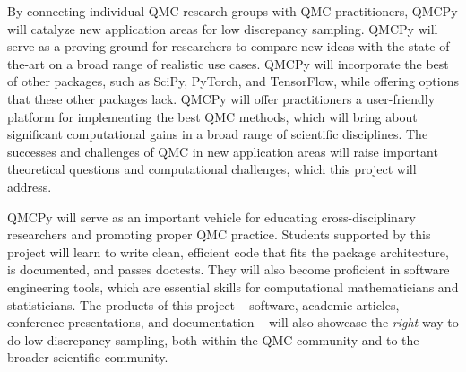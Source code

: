 \documentclass[11pt]{article}%
\begin{document}
\bigskip


\noindent By connecting individual QMC research groups with QMC practitioners, QMCPy will catalyze new application areas for low discrepancy sampling. QMCPy will serve as a proving ground for researchers to compare new ideas with the state-of-the-art on a broad range of realistic use cases. QMCPy will incorporate the best of other packages, such as SciPy, PyTorch, and TensorFlow, while offering options that these other packages lack. QMCPy will offer practitioners a user-friendly platform for implementing the best QMC methods, which will bring about significant computational gains in a broad range of scientific disciplines. The successes and challenges of QMC in new application areas will raise important theoretical questions and computational challenges, which this project will address.

QMCPy will serve as an important vehicle for educating cross-disciplinary researchers and promoting proper QMC practice. Students supported by this project will learn to write clean, efficient code that fits the package architecture, is documented, and passes doctests. They will also become proficient in software engineering tools, which are essential skills for computational mathematicians and statisticians. The products of this project -- software, academic articles, conference presentations, and documentation -- will also showcase the \textit{right} way to do low discrepancy sampling, both within the QMC community and to the broader scientific community.


 
%
\end{document}
